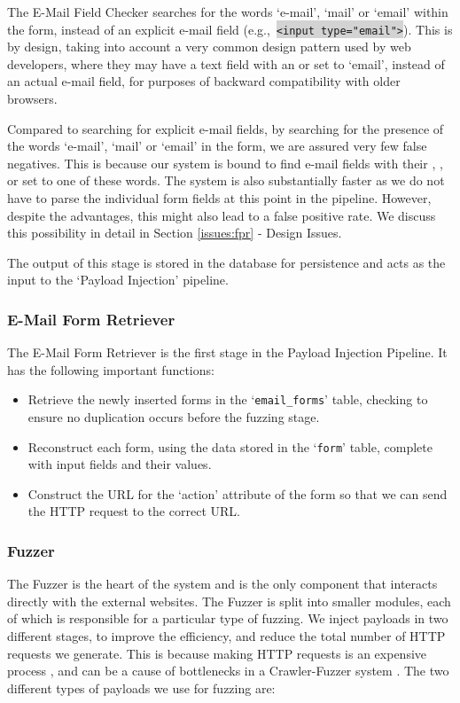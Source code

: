 The E-Mail Field Checker searches for the words `e-mail', `mail' or `email' within the form, instead of an explicit e-mail field (e.g.,\ \colorbox{lightgray}{\lstinline{<input type="email">}}). This is by design, taking into account a very common design pattern used by web developers, where they may have a text field with an  or  set to `email', instead of an actual e-mail field, for purposes of backward compatibility with older browsers.

Compared to searching for explicit e-mail fields, by searching for the presence of the words `e-mail', `mail' or `email' in the form, we are assured very few false negatives. This is because our system is bound to find e-mail fields with their , , or  set to one of these words. The system is also substantially faster as we do not have to parse the individual form fields at this point in the pipeline. However, despite the advantages, this might also lead to a false positive rate. We discuss this possibility in detail in Section \ref*{issues:fpr} - Design Issues. 

The output of this stage is stored in the database for persistence and acts as the input to the `Payload Injection' pipeline.


\subsubsection{E-Mail Form Retriever}
\label{Comp:EMFR}
The E-Mail Form Retriever is the first stage in the Payload Injection Pipeline. It has the following important functions:
\begin{itemize}
	\item Retrieve the newly inserted forms in the `\lstinline{email_forms}' table, checking to ensure no duplication occurs before the fuzzing stage.
	\item Reconstruct each form, using the data stored in the `\lstinline{form}' table, complete with input fields and their values.
	\item Construct the URL for the `action' attribute of the form so that we can send the HTTP request to the correct URL. 
\end{itemize}

\subsubsection{Fuzzer}
\label{Comp:Fuzzer}
The Fuzzer is the heart of the system and is the only component that interacts directly with the external websites. The Fuzzer is split into smaller modules, each of which is responsible for a particular type of fuzzing.  We inject payloads in two different stages, to improve the efficiency, and reduce the total number of HTTP requests we generate. This is because making HTTP requests is an expensive process \cite{McGrath2009}, and can be a cause of bottlenecks in a Crawler-Fuzzer system \cite{ShkapenyukTorstenSuel2001}.
The two different types of payloads we use for fuzzing are:
